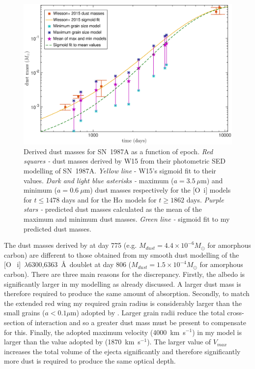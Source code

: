 \begin{figure}
\centering
\includegraphics[trim =70 25 85 15,clip=true,scale=0.46]{chapters/chapter5/images/Mdust_evol7.eps}
\caption{Derived dust masses for SN~1987A as a function of epoch. 
\textit{Red squares -} dust masses derived by W15 
from their photometric SED modelling of SN~1987A. \textit{Yellow line} - 
W15's sigmoid fit to 
their values. \textit{Dark and light blue asterisks -} maximum 
($a=3.5~\mu$m) and 
minimum ($a=0.6~\mu$m) dust masses respectively for the [O~{\sc i}] models 
for $t \le 1478$ days and for the H$\alpha$ models for $t \ge 1862$ days. 
\textit{Purple 
stars -} predicted dust masses calculated as the mean of the maximum and 
minimum dust masses.
\textit{Green line -} sigmoid fit 
to my predicted dust masses.}
\label{Mdust}
\end{figure}


The dust masses derived by \citet{Lucy1989} at day 775 (e.g. $M_{dust}=4.4 
\times 10^{-6} M_{\odot}$ for amorphous carbon) are  
different to those obtained from my smooth dust modelling of the [O~{\sc 
i}]~$\lambda$6300,6363~\AA\ doublet at day 806 ($M_{dust}=1.5 \times 
10^{-4} M_{\odot}$ for amorphous carbon).  There are three main reasons 
for the discrepancy.  Firstly, the albedo is significantly larger in my 
modelling as already discussed.  A larger dust mass is therefore required 
to produce the same amount of absorption.  Secondly, to match the extended 
red wing my required grain radius is considerably larger than the small 
grains ($a < 0.1\mu$m) adopted by \citet{Lucy1989}. Larger grain radii 
reduce the total cross-section of interaction and so a greater dust mass 
must be present to compensate for this. Finally, the adopted maximum 
velocity (4000~km~s$^{-1}$) in my model is larger than the value adopted 
by \citet{Lucy1989} (1870~km~s$^{-1}$).  The larger value of $V_{max}$ 
increases the total volume of the ejecta significantly and therefore 
significantly more dust is required to produce the same optical depth.

